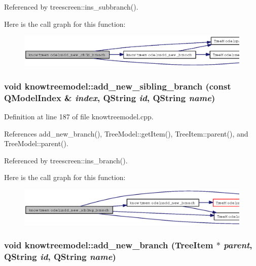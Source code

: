 Referenced by treescreen::ins\_\-subbranch().

Here is the call graph for this function:\begin{figure}[H]
\begin{center}
\leavevmode
\includegraphics[width=404pt]{classknowtreemodel_9a5cf7df4f0e7a1362e1eaa725b7826b_cgraph}
\end{center}
\end{figure}
\subsubsection{\setlength{\rightskip}{0pt plus 5cm}void knowtreemodel::add\_\-new\_\-sibling\_\-branch (const QModel\-Index \& {\em index}, QString {\em id}, QString {\em name})}\label{classknowtreemodel_db22fa31851d2020284c5713ad98e1f1}




Definition at line 187 of file knowtreemodel.cpp.

References add\_\-new\_\-branch(), Tree\-Model::get\-Item(), Tree\-Item::parent(), and Tree\-Model::parent().

Referenced by treescreen::ins\_\-branch().

Here is the call graph for this function:\begin{figure}[H]
\begin{center}
\leavevmode
\includegraphics[width=399pt]{classknowtreemodel_db22fa31851d2020284c5713ad98e1f1_cgraph}
\end{center}
\end{figure}
\subsubsection{\setlength{\rightskip}{0pt plus 5cm}void knowtreemodel::add\_\-new\_\-branch ({\bf Tree\-Item} $\ast$ {\em parent}, QString {\em id}, QString {\em name})}\label{classknowtreemodel_3870358ee6419e354a0e64d35602c496}




